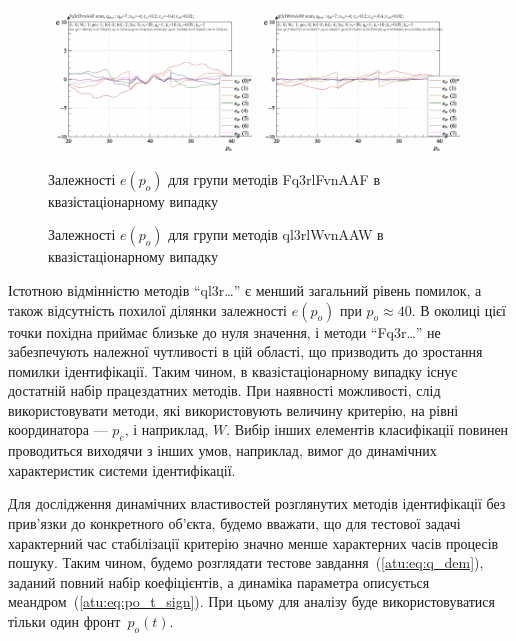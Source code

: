 \documentclass[a4paper,13pt]{atuaref}
\begin{document}
\begin{figure}[htb!]
    \includegraphics[width=0.48\textwidth]{p3/p/scan/qls-p_p_e_Fq3rlFvnAAF_scan.png} \hfill
    \includegraphics[width=0.48\textwidth]{p3/p/scan/qls-p_p_e_ql3rlWvnAAW_scan.png}
  \\
  \parbox[t]{0.48\textwidth} {
    \caption{Залежності $ e (p_o) $ для групи методів Fq3rlFvnAAF в квазістаціонарному випадку}
    \label{atu:f:Fq3rlFvnAAF_scan}
  } \hfill
  \parbox[t]{0.48\textwidth} {
    \caption{Залежності $ e (p_o) $ для групи методів ql3rlWvnAAW в квазістаціонарному випадку}
    \label{atu:f:ql3rlWvnAAW_scan}
  }
\end{figure}

Істотною відмінністю методів ``ql3r\ldots'' є менший загальний рівень
помилок, а також відсутність похилої ділянки залежності $ e (p_o) $ при
$ p_o \approx 40 $. В околиці цієї точки похідна приймає близьке до нуля значення, і
методи ``Fq3r\ldots'' не забезпечують належної чутливості в цій області, що
призводить до зростання помилки ідентифікації.
Таким чином, в квазістаціонарному випадку існує достатній набір працездатних
методів. При наявності можливості, слід використовувати методи, які
використовують величину критерію, на рівні координатора --- $ p_e $, і
наприклад, $ W $. Вибір інших елементів класифікації повинен проводиться
виходячи з інших умов, наприклад, вимог до динамічних характеристик системи
ідентифікації.

Для дослідження динамічних властивостей розглянутих методів ідентифікації без
прив'язки до конкретного об'єкта, будемо вважати, що для тестової задачі
характерний час стабілізації критерію значно менше характерних часів процесів
пошуку.
Таким чином, будемо розглядати тестове завдання~(\ref{atu:eq:q_dem}),
заданий повний набір коефіцієнтів, а динаміка параметра описується меандром~(\ref{atu:eq:po_t_sign}).
При цьому для аналізу буде використовуватися тільки один фронт~$p_o(t)$.
\end{document}
